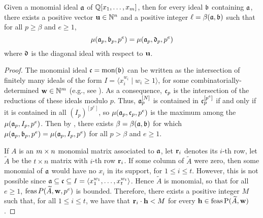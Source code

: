 \documentclass[11pt]{amsart}
\begin{document}
\begin{lemma} \label{reduce me to diagonal: L}
 Given a monomial ideal $\mathfrak{a}$ of $\mathbb{Q}[x_1,\ldots, x_m]$, 
then for every ideal $\mathfrak{b}$ containing $\mathfrak{a}$, there exists a 
positive vector $\mathbf{u} \in \mathbb{N}^n$ and a positive integer $\ell = \beta(\mathfrak{a}, \mathfrak{b})$ such that for all $p \geq \beta$ and $e \geq 1$, 
\[
 \mu(\mathfrak{a}_p, \mathfrak{b}_p, p^e) = \mu(\mathfrak{a}_p, \mathfrak{d}_p, p^e)
\]
where $\mathfrak{d}$ is the diagonal ideal with respect to $\mathbf{u}$.  
\end{lemma}

\begin{proof}
The monomial ideal $\mathfrak{c} = \operatorname{mon}(\mathfrak{b})$ can be written as the intersection of finitely many ideals of the form $I = \langle x_i^{w_i} \mid w_i \geq 1 \rangle$, for some combinatorially-determined $\mathbf{w} \in \mathbb{N}^m$ (e.g., see \cite[Lemma 5.18]{miller+sturmfels.combinatorial_CA}).   
As a consequence, $\mathfrak{c}_p$ is the intersection of the reductions of these ideals modulo $p$. 
Thus, $\mathfrak{a}_p^{[N]}$ is contained in $\mathfrak{c}_p^{[p^e]}$ if and only if it is contained in all  $(I_p)^{[p^e]}$, so $\mu(\mathfrak{a}_p, \mathfrak{c}_p, p^e)$ is the maximum among the  $\mu(\mathfrak{a}_p, I_p, p^e)$.
Then by , there exists $\beta= \beta(\mathfrak{a}, \mathfrak{b})$ for which $\mu(\mathfrak{a}_p, \mathfrak{b}_p, p^e) = \mu(\mathfrak{a}_p, I_p, p^e)$ for all $p > \beta$ and $e \geq 1$.



If $A$ is an $m \times n$ monomial matrix associated to $\mathfrak{a}$, let $\mathbf{r}_i$ denotes its $i$-th row, let $\widetilde{A}$ be the $t \times n$ matrix with $i$-th row $\mathbf{r}_i$.
If some column of $\widetilde{A}$ were zero, then some monomial of $\mathfrak{a}$ would have no $x_i$ in its support, for $1 \leq i \leq t$.  However, this is not possible since  $\mathfrak{a} \subseteq \mathfrak{c} \subseteq I = \langle x_1^{w_1}, \ldots, x_t^{w_t} \rangle$. Hence $\widetilde{A}$ is monomial, so that for all $e \geq 1$, $\operatorname{feas} P(\widetilde{A}, \mathbf{w}, p^e)$ is bounded.  
Therefore, there exists a positive integer $M$ such that, for all $1 \leq i \leq t$, we have that $\mathbf{r}_i \cdot \mathbf{h} < M$ for every $\mathbf{h} \in \operatorname{feas}\mathrm{P}(\widetilde{A}, \mathbf{w})$. 


\end{proof}
\end{document}
